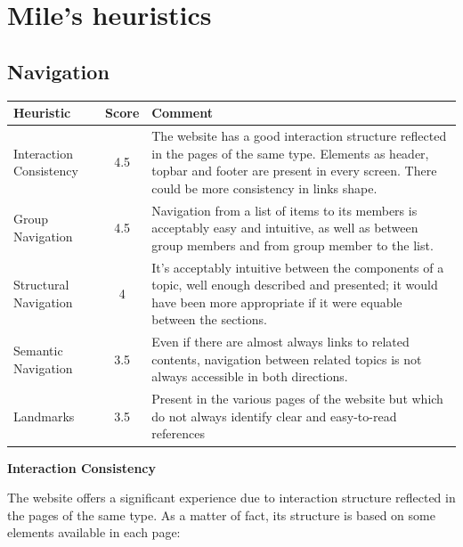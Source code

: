 
\section{Mile's heuristics}
\subsection{Navigation}
\label{Navigation}
\begin{table}[H]
  \begin{center}
    \label{tab:table1}
    \begin{tabular}{||l|c|p{8cm}||} %
      \textbf{Heuristic} & \textbf{Score} & \textbf{Comment}\\
      
      \hline
      Interaction Consistency & 4.5 & The website has a good interaction structure reflected in the pages of the same type. Elements as header, topbar and footer are present in every screen. There could be more consistency in links shape.\\
      \hline
      Group Navigation & 4.5 & Navigation from a list of items to its members is acceptably easy and intuitive, as well as between group members and from group member to the list.\\
      \hline
      Structural Navigation & 4 & It's acceptably intuitive between the components of a topic, well enough described and presented; it would have been more appropriate if it were equable between the sections.\\
      \hline
      Semantic Navigation & 3.5 & Even if there are almost always links to related contents, navigation between related topics is not always accessible in both directions.\\
      Landmarks & 3.5 & Present in the various pages of the website but which do not always identify clear and easy-to-read references\\

    \end{tabular}
  \end{center}
\end{table}
\medskip
\textbf{Interaction Consistency}\par
The website offers a significant experience due to interaction structure reflected in the pages of the same type. As a matter of fact, its structure is based on some elements available in each page: 
